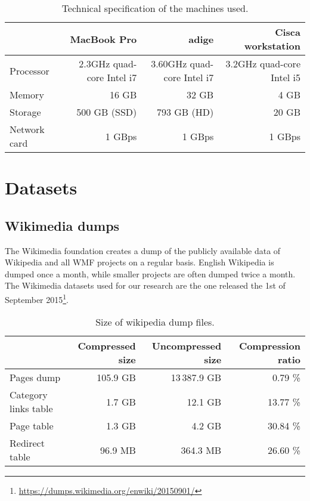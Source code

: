 \begin{table}[]
\centering
\caption{Technical specification of the machines used.}
\label{tbl:tech_specs}
\begin{tabular}{@{}lrrr@{}}
\toprule
\multicolumn{1}{c}{\textbf{}} & \textbf{MacBook Pro}           & \textbf{adige}                  & \textbf{Cisca workstation} \\ \midrule
Processor                     & 2.3GHz quad-core Intel i7 & 3.60GHz quad-core Intel i7 &  3.2GHz quad-core Intel i5  \\
Memory                        & 16 GB                          & 32 GB                           &   4 GB                         \\
Storage                       & 500 GB (SSD)                   & 793 GB (HD)                     &  20 GB                          \\
Network card                  & 1 GBps                         & 1 GBps                          &  1 GBps                          \\ \bottomrule
\end{tabular}
\end{table}


\section{Datasets}
\label{sec:datasets}

\subsection{Wikimedia dumps}
\label{sec:Wikipedia dumps}
The Wikimedia foundation creates a dump of the publicly available data of Wikipedia and all WMF projects on a regular basis.
English Wikipedia is dumped once a month, while smaller projects are often dumped twice a month.
The Wikimedia datasets used for our research are the one released the 1st of September 2015\footnote{\url{https://dumps.wikimedia.org/enwiki/20150901/}}.

\begin{table}[]
\centering
\caption{Size of wikipedia dump files.}
\label{tbl:wikidumps_size}
\begin{tabular}{@{}lrrr@{}}
\multicolumn{1}{c}{\textbf{}} & \textbf{Compressed size} & \textbf{Uncompressed size} & \textbf{Compression ratio} \\ \midrule
Pages dump              &     105.9 GB &   13\,387.9 GB &  0.79 \% \\
Category links table    &       1.7 GB &        12.1 GB & 13.77 \% \\
Page table              &       1.3 GB &         4.2 GB & 30.84 \% \\
Redirect table          &      96.9 MB &       364.3 MB & 26.60 \%
\end{tabular}
\end{table}

